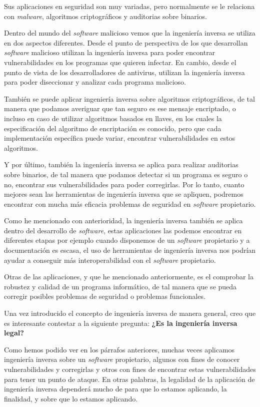 Sus aplicaciones en seguridad son muy variadas, pero normalmente se le relaciona con \textit{malware}, algoritmos criptográficos y auditorias sobre binarios.

Dentro del mundo del \textit{software} malicioso vemos que la ingeniería inversa se utiliza en dos aspectos diferentes. Desde el punto de perspectiva de los que desarrollan
\textit{software} malicioso utilizan la ingeniería inversa para poder encontrar vulnerabilidades en los programas que quieren infectar. En cambio, desde el punto de vista de los
desarrolladores de antivirus, utilizan la ingeniería inversa para poder diseccionar y analizar cada programa malicioso.

También se puede aplicar ingeniería inversa sobre algoritmos criptográficos, de tal manera que podamos averiguar que tan seguro es ese mensaje encriptado, o incluso en caso de utilizar
algoritmos basados en llaves, en los cuales la especificación del algoritmo de encriptación es conocido, pero que cada implementación específica puede variar, encontrar vulnerabilidades
en estos algoritmos.

Y por último, también la ingeniería inversa se aplica para realizar auditorias sobre binarios, de tal manera que podamos detectar si un programa es seguro o no, encontrar sus vulnerabilidades
para poder corregirlas. Por lo tanto, cuanto mejores sean las herramientas de ingeniería inversa que se apliquen, podremos encontrar con mucha más eficacia problemas de seguridad en
\textit{software} propietario.

Como he mencionado con anterioridad, la ingeniería inversa también se aplica dentro del desarrollo de \textit{software}, estas aplicaciones las podemos encontrar en diferentes etapas
por ejemplo cuando disponemos de un \textit{software} propietario y a documentación es escasa, el uso de herramientas de ingeniería inversa nos podrían ayudar a conseguir más interoperabilidad
con el \textit{software} propietario.

Otras de las aplicaciones, y que he mencionado anteriormente, es el comprobar la robustez y calidad de un programa informático, de tal manera que se pueda corregir posibles problemas
de seguridad o problemas funcionales.

Una vez introducido el concepto de ingeniería inversa de manera general, creo que es interesante contestar a la siguiente pregunta: \textbf{¿Es la ingeniería inversa legal?}

Como hemos podido ver en los párrafos anteriores, muchas veces aplicamos ingeniería inversa sobre un \textit{software} propietario, algunos con fines de conocer vulnerabilidades y corregirlas
y otros con fines de encontrar estas vulnerabilidades para tener un punto de ataque. En otras palabras, la legalidad de la aplicación de ingeniería inversa dependerá mucho de para
que lo estamos aplicando, la finalidad, y sobre que lo estamos aplicando.

